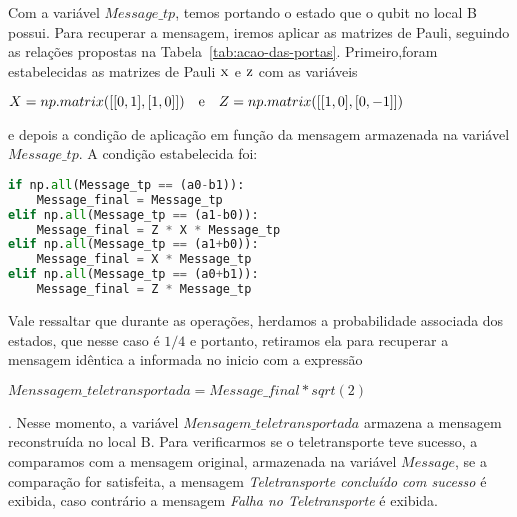Com a variável \textit{$Message\_tp$}, temos portando o estado que o qubit no local B possui. Para recuperar a mensagem, iremos aplicar as matrizes de Pauli, seguindo as relações propostas na Tabela~\ref{tab:acao-das-portas}. Primeiro,foram estabelecidas as matrizes de Pauli \(\operatorname{\textsc{x}}\) e \(\operatorname{\textsc{z}}\) com as variáveis \begin{tiny}\textbf{$X = np.matrix([[0, 1], [1, 0]]) \quad \text e \quad Z = np.matrix([[1, 0], [0, -1]])$}\end{tiny} e depois a condição de aplicação em função da mensagem armazenada na variável \textit{$Message\_tp$}. A condição estabelecida foi:

\begin{center}
\begin{lstlisting}[language=Python, caption=Relação de condição para aplicação das portas de Pauli.]
if np.all(Message_tp == (a0-b1)):
    Message_final = Message_tp
elif np.all(Message_tp == (a1-b0)):
    Message_final = Z * X * Message_tp 
elif np.all(Message_tp == (a1+b0)):
    Message_final = X * Message_tp 
elif np.all(Message_tp == (a0+b1)):
    Message_final = Z * Message_tp 
\end{lstlisting}
\end{center}
Vale ressaltar que durante as operações, herdamos a probabilidade associada dos estados, que nesse caso é $1/4$ e portanto, retiramos ela para recuperar a mensagem idêntica a informada no inicio com a expressão \begin{tiny}\textbf{$Menssagem\_teletransportada = Message\_final*sqrt(2)$}\end{tiny}. Nesse momento, a variável \textit{$Mensagem\_teletransportada$} armazena a mensagem reconstruída no local B. Para verificarmos se o teletransporte teve sucesso, a comparamos com a mensagem original, armazenada na variável \textit{$Message$}, se a comparação for satisfeita, a mensagem \textit{Teletransporte concluído com sucesso} é exibida, caso contrário a mensagem \textit{Falha no Teletransporte} é exibida.
	
\clearpage
